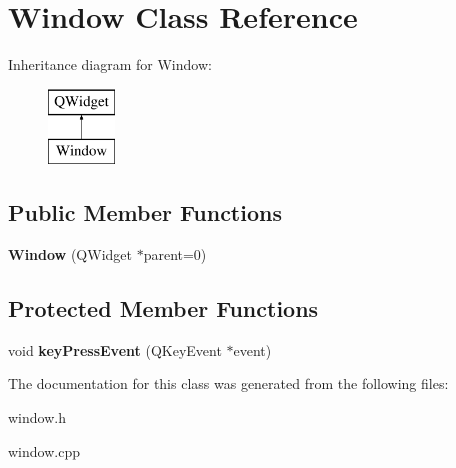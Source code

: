 \hypertarget{class_window}{}\section{Window Class Reference}
\label{class_window}
Inheritance diagram for Window\+:\begin{figure}[H]
\begin{center}
\leavevmode
\includegraphics[height=2.000000cm]{class_window}
\end{center}
\end{figure}
\subsection*{Public Member Functions}
\begin{DoxyCompactItemize}
\item 
\mbox{\label{class_window_ab27fe44e0834066236f79f244b02f67e}} 
{\bfseries Window} (Q\+Widget $\ast$parent=0)
\end{DoxyCompactItemize}
\subsection*{Protected Member Functions}
\begin{DoxyCompactItemize}
\item 
\mbox{\label{class_window_a52322a90bc51afcd17b90a152d64f36a}} 
void {\bfseries key\+Press\+Event} (Q\+Key\+Event $\ast$event)
\end{DoxyCompactItemize}


The documentation for this class was generated from the following files\+:\begin{DoxyCompactItemize}
\item 
window.\+h\item 
window.\+cpp\end{DoxyCompactItemize}
